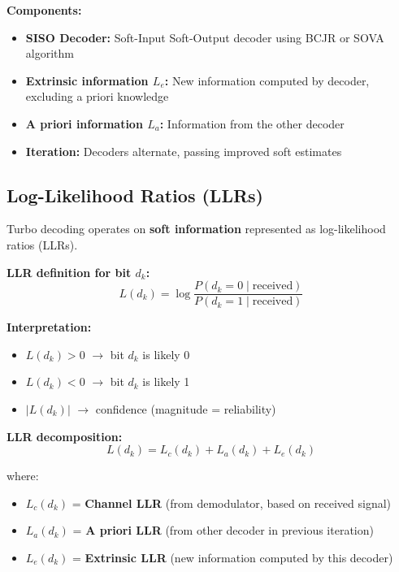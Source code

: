 \textbf{Components:}
\begin{itemize}
\item \textbf{SISO Decoder:} Soft-Input Soft-Output decoder using BCJR or SOVA algorithm
\item \textbf{Extrinsic information $L_e$:} New information computed by decoder, excluding a priori knowledge
\item \textbf{A priori information $L_a$:} Information from the other decoder
\item \textbf{Iteration:} Decoders alternate, passing improved soft estimates
\end{itemize}

\subsection{Log-Likelihood Ratios (LLRs)}

Turbo decoding operates on \textbf{soft information} represented as log-likelihood ratios (LLRs).

\textbf{LLR definition for bit $d_k$:}
\begin{equation}
L(d_k) = \log\frac{P(d_k = 0 \mid \text{received})}{P(d_k = 1 \mid \text{received})}
\label{eq:llr-definition}
\end{equation}

\textbf{Interpretation:}
\begin{itemize}
\item $L(d_k) > 0$ $\rightarrow$ bit $d_k$ is likely 0
\item $L(d_k) < 0$ $\rightarrow$ bit $d_k$ is likely 1
\item $|L(d_k)|$ $\rightarrow$ confidence (magnitude = reliability)
\end{itemize}

\textbf{LLR decomposition:}
\begin{equation}
L(d_k) = L_c(d_k) + L_a(d_k) + L_e(d_k)
\label{eq:llr-decomposition}
\end{equation}

where:
\begin{itemize}
\item $L_c(d_k)$ = \textbf{Channel LLR} (from demodulator, based on received signal)
\item $L_a(d_k)$ = \textbf{A priori LLR} (from other decoder in previous iteration)
\item $L_e(d_k)$ = \textbf{Extrinsic LLR} (new information computed by this decoder)
\end{itemize}

